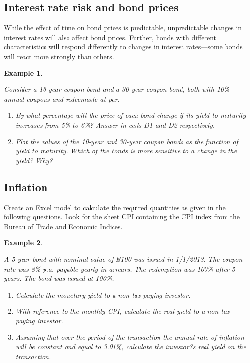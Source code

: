 \documentclass[
]{article}
\theoremstyle{definition}
\theoremstyle{definition}
\newtheorem{example}{Example}[section]
\theoremstyle{definition}
\theoremstyle{definition}
\theoremstyle{remark}
\begin{document}
\hypertarget{interest-rate-risk-and-bond-prices}{%
\subsection{Interest rate risk and bond prices}\label{interest-rate-risk-and-bond-prices}}

While the effect of time on bond prices is predictable, unpredictable
changes in interest rates will also affect bond prices. Further, bonds
with different characteristics will respond differently to changes in
interest rates---some bonds will react more strongly than others.

\begin{example}
\protect\hypertarget{exm:unlabeled-div-17}{}\label{exm:unlabeled-div-17}

\emph{Consider a 10-year coupon bond and a 30-year coupon
bond, both with 10\% annual coupons and redeemable at par.}

\begin{enumerate}
\def\labelenumi{\arabic{enumi}.}
\item
  \emph{By what percentage will the price of each bond change if its yield
  to maturity increases from 5\% to 6\%? Answer in cells D1 and D2
  respectively.}
\item
  \emph{Plot the values of the 10-year and 30-year coupon bonds as the
  function of yield to maturity. Which of the bonds is more sensitive
  to a change in the yield? Why?}
\end{enumerate}

\end{example}

\hypertarget{inflation}{%
\subsection{Inflation}\label{inflation}}

Create an Excel model to calculate the required quantities as given in
the following questions. Look for the sheet CPI containing the CPI index
from the Bureau of Trade and Economic Indices.

\begin{example}
\protect\hypertarget{exm:unlabeled-div-18}{}\label{exm:unlabeled-div-18}

\emph{A 5-year bond with nominal value of ฿100 was issued in
1/1/2013. The coupon rate was 8\% p.a. payable yearly in arrears. The
redemption was 100\% after 5 years. The bond was issued at 100\%.}

\begin{enumerate}
\def\labelenumi{\arabic{enumi}.}
\item
  \emph{Calculate the monetary yield to a non-tax paying investor.}
\item
  \emph{With reference to the monthly CPI, calculate the real yield to a
  non-tax paying investor.}
\item
  \emph{Assuming that over the period of the transaction the annual rate of
  inflation will be constant and equal to 3.01\%, calculate the
  investor?s real yield on the transaction.}
\end{enumerate}

\end{example}
\end{document}
